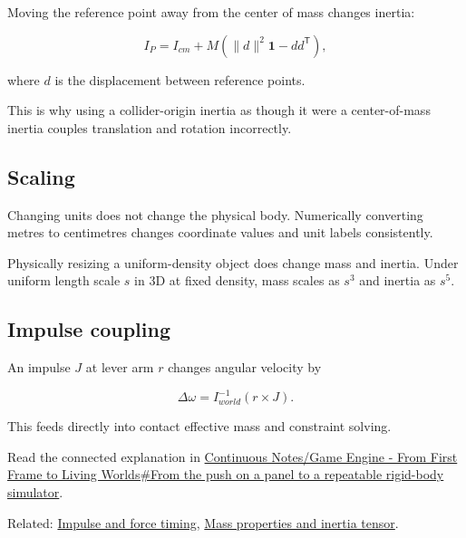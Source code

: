 Moving the reference point away from the center of mass changes inertia:

\[
I_P=
I_{cm}
+
M\left(
\|d\|^2\mathbf{1}-dd^{\mathsf T}
\right),
\]

where \(d\) is the displacement between reference points.

This is why using a collider-origin inertia as though it were a center-of-mass inertia couples translation and rotation incorrectly.

\subsection{Scaling}\label{appendix-66742099f8a0-scaling}

\hypertarget{appendix-66742099f8a0-scaling}{}

Changing units does not change the physical body. Numerically converting metres to centimetres changes coordinate values and unit labels consistently.

Physically resizing a uniform-density object does change mass and inertia. Under uniform length scale \(s\) in 3D at fixed density, mass scales as \(s^3\) and inertia as \(s^5\).

\subsection{Impulse coupling}\label{appendix-66742099f8a0-impulse-coupling}

\hypertarget{appendix-66742099f8a0-impulse-coupling}{}

An impulse \(J\) at lever arm \(r\) changes angular velocity by

\[
\Delta\omega=I^{-1}_{world}(r\times J).
\]

This feeds directly into contact effective mass and constraint solving.

Read the connected explanation in \hyperref[06-engine-ii-ch034-from-the-push-on-a-panel-to-a-repeatable-rigid-body-simulator]{Continuous Notes/Game Engine - From First Frame to Living Worlds\#From the push on a panel to a repeatable rigid-body simulator}.

Related: \hyperref[appendix-c39931e6e4c2]{Impulse and force timing}, \hyperref[06-engine-ii-ch035-part-1637-composite-body-mass-properties]{Mass properties and inertia tensor}.
